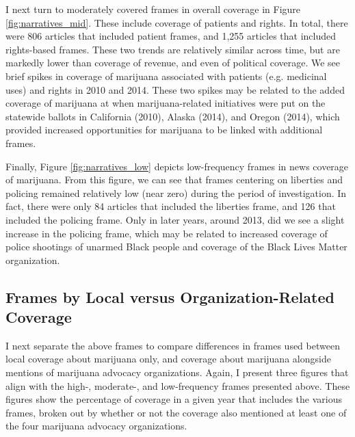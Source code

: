 I next turn to moderately covered frames in overall coverage in Figure \ref{fig:narratives_mid}. These include coverage of patients and rights. In total, there were 806 articles that included patient frames, and 1,255 articles that included rights-based frames. These two trends are relatively similar across time, but are markedly lower than coverage of revenue, and even of political coverage. We see brief spikes in coverage of marijuana associated with patients (e.g. medicinal uses) and rights in 2010 and 2014. These two spikes may be related to the added coverage of marijuana at when marijuana-related initiatives were put on the statewide ballots in California (2010), Alaska (2014), and Oregon (2014), which provided increased opportunities for marijuana to be linked with additional frames.



Finally, Figure \ref{fig:narratives_low} depicts low-frequency frames in news coverage of marijuana. From this figure, we can see that frames centering on liberties and policing remained relatively low (near zero) during the period of investigation. In fact, there were only 84 articles that included the liberties frame, and 126 that included the policing frame. Only in later years, around 2013, did we see a slight increase in the policing frame, which may be related to increased coverage of police shootings of unarmed Black people and coverage of the Black Lives Matter organization. 





\subsection{Frames by Local versus Organization-Related Coverage}

I next separate the above frames to compare differences in frames used between local coverage about marijuana only, and coverage about marijuana alongside mentions of marijuana advocacy organizations. Again, I present three figures that align with the high-, moderate-, and low-frequency frames presented above. These figures show the percentage of coverage in a given year that includes the various frames, broken out by whether or not the coverage also mentioned at least one of the four marijuana advocacy organizations. 

